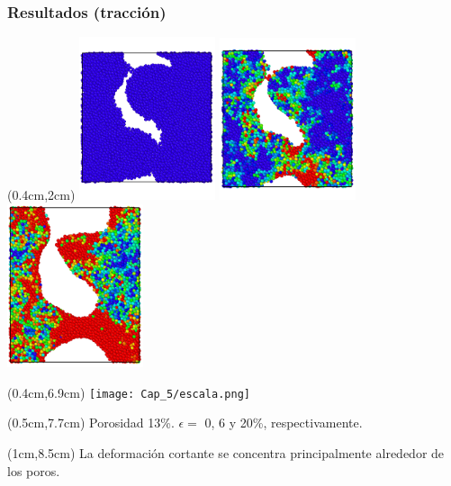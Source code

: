 \begin{frame}
    \frametitle{Resultados (tracci\'on)}
    \begin{textblock*}{12cm}(0.4cm,2cm) %
        \includegraphics[width=4cm]{Presentacion_PANACM_Franco/13_0strain.png}
        \includegraphics[width=4cm]{Presentacion_PANACM_Franco/13_6strain_tens.png}
        \includegraphics[width=4cm]{Presentacion_PANACM_Franco/13_20strain_tens_2.png}
    \end{textblock*}
    \begin{textblock*}{12cm}(0.4cm,6.9cm)
     \centering
        \texttt{[image: Cap\_5/escala.png]}
    \end{textblock*}
    \begin{textblock*}{12cm}(0.5cm,7.7cm)
        \centering
        \scriptsize{Porosidad 13\%. $\epsilon=$ 0, 6 y 20\%, respectivamente.}
    \end{textblock*}
    \begin{textblock*}{11.5cm}(1cm,8.5cm) %
    \centering
	La deformaci\'on cortante se concentra principalmente alrededor de los poros.
    \end{textblock*}
\end{frame}

